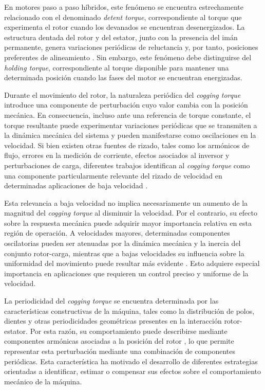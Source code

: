 En motores paso a paso híbridos, este fenómeno se encuentra estrechamente relacionado con el denominado \textit{detent torque}, correspondiente al torque que experimenta el rotor cuando los devanados se encuentran desenergizados. La estructura dentada del rotor y del estator, junto con la presencia del imán permanente, genera variaciones periódicas de reluctancia y, por tanto, posiciones preferentes de alineamiento \cite{vierbergenPredictingImprovingBehaviour}. Sin embargo, este fenómeno debe distinguirse del \textit{holding torque}, correspondiente al torque disponible para mantener una determinada posición cuando las fases del motor se encuentran energizadas.

Durante el movimiento del rotor, la naturaleza periódica del \textit{cogging torque} introduce una componente de perturbación cuyo valor cambia con la posición mecánica. En consecuencia, incluso ante una referencia de torque constante, el torque resultante puede experimentar variaciones periódicas que se transmiten a la dinámica mecánica del sistema y pueden manifestarse como oscilaciones en la velocidad. Si bien existen otras fuentes de rizado, tales como los armónicos de flujo, errores en la medición de corriente, efectos asociados al inversor y perturbaciones de carga, diferentes trabajos identifican al \textit{cogging torque} como una componente particularmente relevante del rizado de velocidad en determinadas aplicaciones de baja velocidad \cite{buSpeedRippleReduction2021,wuSpeedControlLowSpeed2025}.

Esta relevancia a baja velocidad no implica necesariamente un aumento de la magnitud del \textit{cogging torque} al disminuir la velocidad. Por el contrario, su efecto sobre la respuesta mecánica puede adquirir mayor importancia relativa en esta región de operación. A velocidades mayores, determinadas componentes oscilatorias pueden ser atenuadas por la dinámica mecánica y la inercia del conjunto rotor-carga, mientras que a bajas velocidades su influencia sobre la uniformidad del movimiento puede resultar más evidente \cite{houariSpeedRipplesReduction2022}. Esto adquiere especial importancia en aplicaciones que requieren un control preciso y uniforme de la velocidad.

La periodicidad del \textit{cogging torque} se encuentra determinada por las características constructivas de la máquina, tales como la distribución de polos, dientes y otras periodicidades geométricas presentes en la interacción rotor-estator. Por esta razón, su comportamiento puede describirse mediante componentes armónicas asociadas a la posición del rotor \cite{guzinskiSensorlessLowSpeed2019,piccoliCoggingTorqueRipple2014a}, lo que permite representar esta perturbación mediante una combinación de componentes periódicas. Esta característica ha motivado el desarrollo de diferentes estrategias orientadas a identificar, estimar o compensar sus efectos sobre el comportamiento mecánico de la máquina.


